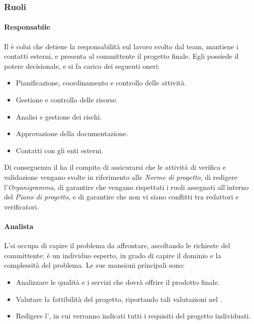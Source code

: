 \subsubsection{Ruoli}
\paragraph{Responsabile}
Il \RdP{} è colui che detiene la responsabilità sul lavoro svolto dal team, mantiene i contatti esterni, e presenta al committente il progetto finale. Egli possiede il potere decisionale, e si fa carico dei seguenti oneri:
\begin{itemize}
	\item Pianificazione, coordinamento e controllo delle attività.
	\item Gestione e controllo delle risorse.
	\item Analisi e gestione dei rischi.
	\item Approvazione della documentazione.
	\item Contatti con gli enti esterni.
\end{itemize}
Di conseguenza il \RdP{} ha il compito di assicurarsi che le attività di verifica e validazione vengano svolte in riferimento alle \emph{Norme di progetto}, di redigere l'\emph{{{Organigramma}}}, di garantire che vengano rispettati i ruoli assegnati all'interno del \emph{Piano di progetto}, e di garantire che non vi siano conflitti tra redattori e verificatori. 

\paragraph{Analista}
L'\ana si occupa di capire il problema da affrontare, ascoltando le richieste del committente; è un individuo esperto, in grado di capire il dominio e la complessità del problema. Le sue mansioni principali sono:
\begin{itemize}
	\item Analizzare le qualità e i servizi che dovrà offrire il prodotto finale.
	\item Valutare la fattibilità del progetto, riportando tali valutazioni nel \SdF{}.
	\item Redigere l'\AdR{}, in cui verranno indicati tutti i requisiti del progetto individuati.
\end{itemize}


